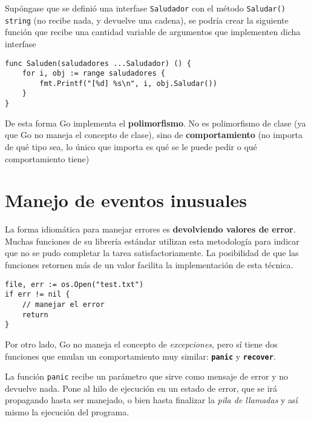 Supóngase que se definió una interfase \texttt{Saludador} con el método \texttt{Saludar() string} (no recibe nada, y devuelve una cadena), se podría crear la siguiente función que recibe una cantidad variable de argumentos que implementen dicha interfase 

\vspace*{5mm}
\begin{lstlisting}[title=Comportamiento polimórfico]
func Saluden(saludadores ...Saludador) () {
    for i, obj := range saludadores {
        fmt.Printf("[%d] %s\n", i, obj.Saludar())
    }
}
\end{lstlisting}

De esta forma Go implementa el \textbf{polimorfismo}. No es polimorfismo de clase (ya que Go no maneja el concepto de clase), sino de \textbf{comportamiento} (no importa de qué tipo sea, lo único que importa es qué se le puede pedir o qué comportamiento tiene)  

\section{Manejo de eventos inusuales}

La forma idiomática para manejar errores es \textbf{devolviendo valores de error}. Muchas funciones de su librería estándar utilizan esta metodología para indicar que no se pudo completar la tarea satisfactoriamente.  La posibilidad de que las funciones retornen más de un valor facilita la implementación de esta técnica.

\vspace*{5mm}
\begin{lstlisting}[title={\centering La función \texttt{Open} de la librería \texttt{os} devuelve el descriptor del archivo que se quiere abrir, y un valor de error en caso de que no se haya podido}]
file, err := os.Open("test.txt")
if err != nil {
    // manejar el error
    return
}
\end{lstlisting}

Por otro lado, Go no maneja el concepto de \emph{excepciones}, pero sí tiene dos funciones que emulan un comportamiento muy similar: \texttt{\textbf{panic}} y \texttt{\textbf{recover}}.

La función \texttt{panic} recibe un parámetro que sirve como mensaje de error y no devuelve nada. Pone al hilo de ejecución en un estado de error, que se irá propagando hasta ser manejado, o bien hasta finalizar la \emph{pila de llamadas} y así mismo la ejecución del programa. 


